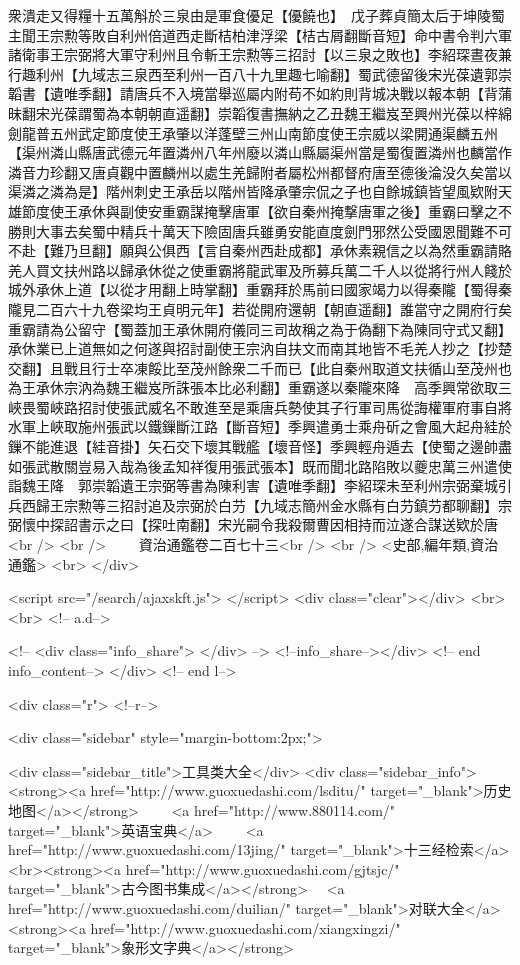 衆潰走又得糧十五萬斛於三泉由是軍食優足【優饒也】　戊子葬貞簡太后于坤陵蜀主聞王宗勲等敗自利州倍道西走斷桔柏津浮梁【桔古屑翻斷音短】命中書令判六軍諸衛事王宗弼將大軍守利州且令斬王宗勲等三招討【以三泉之敗也】李紹琛晝夜兼行趣利州【九域志三泉西至利州一百八十九里趣七喻翻】蜀武德留後宋光葆遺郭崇韜書【遺唯季翻】請唐兵不入境當舉巡屬内附苟不如約則背城决戰以報本朝【背蒲昧翻宋光葆謂蜀為本朝朝直遥翻】崇韜復書撫納之乙丑魏王繼岌至興州光葆以梓綿劍龍普五州武定節度使王承肇以洋蓬壁三州山南節度使王宗威以梁開通渠麟五州【渠州潾山縣唐武德元年置潾州八年州廢以潾山縣屬渠州當是蜀復置潾州也麟當作潾音力珍翻又唐貞觀中置麟州以處生羌歸附者屬松州都督府唐至德後淪没久矣當以渠潾之潾為是】階州刺史王承岳以階州皆降承肇宗侃之子也自餘城鎮皆望風欵附天雄節度使王承休與副使安重霸謀掩擊唐軍【欲自秦州掩撃唐軍之後】重霸曰擊之不勝則大事去矣蜀中精兵十萬天下險固唐兵雖勇安能直度劍門邪然公受國恩聞難不可不赴【難乃旦翻】願與公俱西【言自秦州西赴成都】承休素親信之以為然重霸請賂羌人買文扶州路以歸承休從之使重霸將龍武軍及所募兵萬二千人以從將行州人餞於城外承休上道【以從才用翻上時掌翻】重霸拜於馬前曰國家竭力以得秦隴【蜀得秦隴見二百六十九卷梁均王貞明元年】若從開府還朝【朝直遥翻】誰當守之開府行矣重霸請為公留守【蜀蓋加王承休開府儀同三司故稱之為于偽翻下為陳同守式又翻】承休業已上道無如之何遂與招討副使王宗汭自扶文而南其地皆不毛羌人抄之【抄楚交翻】且戰且行士卒凍餒比至茂州餘衆二千而已【此自秦州取道文扶循山至茂州也為王承休宗汭為魏王繼岌所誅張本比必利翻】重霸遂以秦隴來降　高季興常欲取三峽畏蜀峽路招討使張武威名不敢進至是乘唐兵勢使其子行軍司馬從誨權軍府事自將水軍上峽取施州張武以鐵鏁斷江路【斷音短】季興遣勇士乘舟斫之會風大起舟絓於鏁不能進退【絓音掛】矢石交下壞其戰艦【壞音怪】季興輕舟遁去【使蜀之邊帥盡如張武散關豈易入哉為後孟知祥復用張武張本】既而聞北路陷敗以夔忠萬三州遣使詣魏王降　郭崇韜遺王宗弼等書為陳利害【遺唯季翻】李紹琛未至利州宗弼棄城引兵西歸王宗勲等三招討追及宗弼於白芀【九域志簡州金水縣有白芀鎮芀都聊翻】宗弼懷中探詔書示之曰【探吐南翻】宋光嗣令我殺爾曹因相持而泣遂合謀送欵於唐<br />
<br />
　　資治通鑑卷二百七十三<br />
<br />
<史部,編年類,資治通鑑>  <br>
   </div> 

<script src="/search/ajaxskft.js"> </script>
 <div class="clear"></div>
<br>
<br>
 <!-- a.d-->

 <!--
<div class="info_share">
</div> 
-->
 <!--info_share--></div>   <!-- end info_content-->
  </div> <!-- end l-->

<div class="r">   <!--r-->



<div class="sidebar"  style="margin-bottom:2px;">

 
<div class="sidebar_title">工具类大全</div>
<div class="sidebar_info">
<strong><a href="http://www.guoxuedashi.com/lsditu/" target="_blank">历史地图</a></strong>　　
<a href="http://www.880114.com/" target="_blank">英语宝典</a>　　
<a href="http://www.guoxuedashi.com/13jing/" target="_blank">十三经检索</a>　
<br><strong><a href="http://www.guoxuedashi.com/gjtsjc/" target="_blank">古今图书集成</a></strong>　
<a href="http://www.guoxuedashi.com/duilian/" target="_blank">对联大全</a>　<strong><a href="http://www.guoxuedashi.com/xiangxingzi/" target="_blank">象形文字典</a></strong>　

